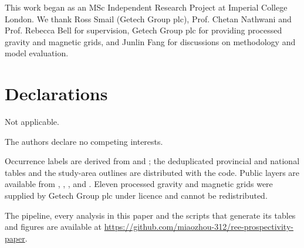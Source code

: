 \documentclass[pdflatex,sn-apa]{sn-jnl}
\begin{document}
\backmatter

This work began as an MSc Independent Research Project at Imperial College London. We thank Ross Smail (Getech Group plc), Prof. Chetan Nathwani and Prof. Rebecca Bell for supervision, Getech Group plc for providing processed gravity and magnetic grids, and Junlin Fang for discussions on methodology and model evaluation.

\section*{Declarations}

Not applicable.

The authors declare no competing interests.

Occurrence labels are derived from \citet{Orris2018} and \citet{Parsa2024}; the deduplicated provincial and national tables and the study-area outlines are distributed with the code. Public layers are available from \citet{McCafferty2023}, \citet{Jobin2017}, \citet{Miles2016}, \citet{BradleyDC2008} and \citet{Wheeler1996}. Eleven processed gravity and magnetic grids were supplied by Getech Group plc under licence and cannot be redistributed.

The pipeline, every analysis in this paper and the scripts that generate its tables and figures are available at \url{https://github.com/miaozhou-312/ree-prospectivity-paper}.
\end{document}
